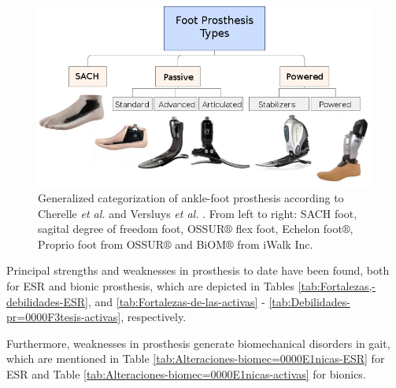 \documentclass[12pt,english]{article}
\begin{document}
\begin{figure}[H]
\begin{centering}
\includegraphics[scale=0.68]{GeneracionesprotesisEng}
\par\end{centering}

\caption{\label{fig:Categorizaci=0000F3n-seg=0000FAn-Cherelle} Generalized categorization of ankle-foot prosthesis according to Cherelle \emph{et al.}\cite{Cherelle2014a} and Versluys \emph{et al.} \cite{Versluys2009}. From left to right: SACH foot, sagital degree of freedom foot, OSSUR$\circledR$ flex foot, Echelon foot$\circledR$, Proprio foot from OSSUR$\circledR$ and BiOM$\circledR$ from iWalk Inc.}
\end{figure}

Principal strengths and weaknesses in prosthesis to date have been found, both for ESR and bionic prosthesis, which are depicted in Tables \ref{tab:Fortalezas,-debilidades-ESR}, and \ref{tab:Fortalezas-de-las-activas} - \ref{tab:Debilidades-pr=0000F3tesis-activas}, respectively. 

Furthermore, weaknesses in prosthesis generate biomechanical disorders in gait, which are mentioned in Table \ref{tab:Alteraciones-biomec=0000E1nicas-ESR} for ESR and Table \ref{tab:Alteraciones-biomec=0000E1nicas-activas} for bionics.
\end{document}
